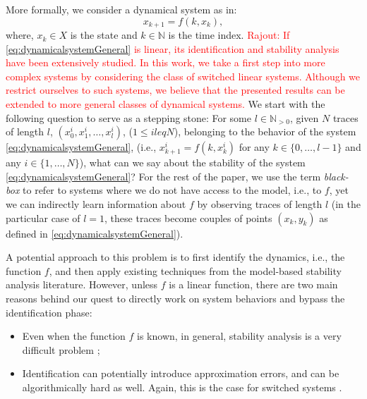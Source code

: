 More formally, we consider a dynamical system as in:
\vspace{-0.88394mm}
\begin{equation}\label{eq:dynamicalsystemGeneral}
x_{k+1} = f(k, x_k),
\end{equation}
where, $x_k \in X$ is the state and $k \in \mathbb{N}$ is the time index. 
\textcolor{red}{Rajout: If \eqref{eq:dynamicalsystemGeneral} is linear, its identification and stability analysis have been extensively studied. In this work, we take a first step into more complex systems by considering the class of switched linear systems. Although we restrict ourselves to such systems, we believe that the presented results can be extended to more general classes of dynamical systems.} 
We start with the following question to serve as a stepping stone: For some $l \in \mathbb{N}_{>0}$, given $N$ traces of length $l$, $(x_0^i,x_1^i,\dots, x_l^i)$, ($1 \leq i leq N$), belonging to the behavior of the system \eqref{eq:dynamicalsystemGeneral}, (i.e., $x_{k+1}^i = f(k, x_k^i)$ for any $k \in \{0,\dots,l-1\}$ and any $i \in \{1,\dots,N\}$), what can we say about the stability of the system \eqref{eq:dynamicalsystemGeneral}? For the rest of the paper, we use the term \emph{black-box} to refer to systems where we do not have access to the model, i.e., to $f$, yet we can indirectly learn information about $f$ by observing traces of length $l$ (in the particular case of $l=1$, these traces become couples of points $(x_k, y_k)$ as defined in \eqref{eq:dynamicalsystemGeneral}).

A potential approach to this problem is to first identify the dynamics, i.e., the function $f$, and then apply existing techniques from the model-based stability analysis literature. However, unless $f$ is a linear function, there are two main reasons behind our quest to directly work on system behaviors and bypass the identification phase: 
\begin{itemize}
\item Even when the function $f$ is known, in general, stability analysis is a very difficult problem \cite{stabilityHard1}; 
\item Identification can potentially introduce approximation errors, and can be algorithmically hard as well. Again, this is the case for switched systems \cite{lauer}. 
\end{itemize}

